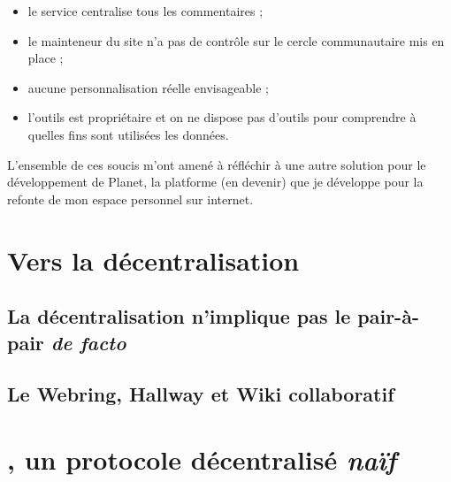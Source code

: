 \documentclass[a4paper,10pt]{article}
\begin{document}
\begin{itemize}
\item le service centralise tous les commentaires ;
\item le mainteneur du site n'a pas de contrôle sur le cercle communautaire mis en place ;
\item aucune personnalisation réelle envisageable ;
\item l'outils est propriétaire et on ne dispose pas d'outils pour comprendre à quelles
  fins sont utilisées les données.\\
\end{itemize}

L'ensemble de ces soucis m'ont amené à réfléchir à une autre solution pour le développement
de Planet\cite{planet}, la platforme (en devenir) que je développe pour la refonte
de mon espace personnel sur internet.

\section*{Vers la décentralisation}

\subsection*{La décentralisation n'implique pas le pair-à-pair \textit{de facto}}

\subsection*{Le Webring, Hallway et Wiki collaboratif}

\section*{, un protocole décentralisé \textit{naïf}}

\newpage


\end{document}
